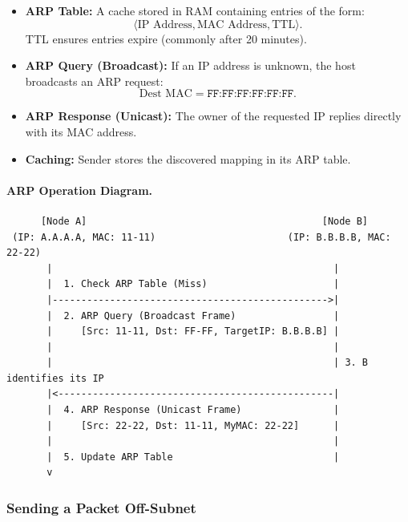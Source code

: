 \documentclass[12pt]{article}
\begin{document}
\begin{itemize}
    \item \textbf{ARP Table:} A cache stored in RAM containing entries of the form:
          \[
              \langle \text{IP Address}, \text{MAC Address}, \text{TTL} \rangle.
          \]
          TTL ensures entries expire (commonly after 20 minutes).

    \item \textbf{ARP Query (Broadcast):}
          If an IP address is unknown, the host broadcasts an ARP request:
          \[
              \text{Dest MAC} = \texttt{FF:FF:FF:FF:FF:FF}.
          \]

    \item \textbf{ARP Response (Unicast):}
          The owner of the requested IP replies directly with its MAC address.

    \item \textbf{Caching:}
          Sender stores the discovered mapping in its ARP table.
\end{itemize}

\paragraph{ARP Operation Diagram.}

\begin{verbatim}
      [Node A]                                         [Node B]
 (IP: A.A.A.A, MAC: 11-11)                       (IP: B.B.B.B, MAC: 22-22)
       |                                                 |
       |  1. Check ARP Table (Miss)                      |
       |------------------------------------------------>|
       |  2. ARP Query (Broadcast Frame)                 |
       |     [Src: 11-11, Dst: FF-FF, TargetIP: B.B.B.B] |
       |                                                 |
       |                                                 | 3. B identifies its IP
       |<------------------------------------------------|
       |  4. ARP Response (Unicast Frame)                |
       |     [Src: 22-22, Dst: 11-11, MyMAC: 22-22]      |
       |                                                 |
       |  5. Update ARP Table                            |
       v
\end{verbatim}

\subsubsection{Sending a Packet Off-Subnet}
\end{document}
